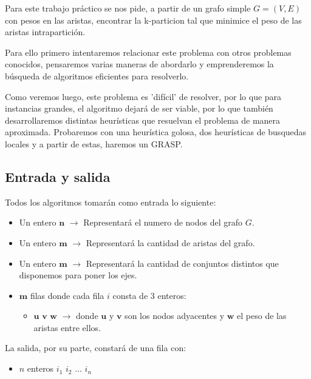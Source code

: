 Para este trabajo práctico se nos pide, a partir de un grafo simple $G=(V,E)$ con pesos en las aristas, encontrar la k-particion tal que minimice el peso de las aristas intrapartición.

Para ello primero intentaremos relacionar este problema con otros problemas conocidos, pensaremos varias maneras de abordarlo y emprenderemos la búsqueda de algoritmos eficientes para resolverlo.

Como veremos luego, este problema es 'difícil' de resolver, por lo que para instancias grandes, el algoritmo dejará de ser viable, por lo que también desarrollaremos distintas heurísticas que resuelvan el problema de manera aproximada. Probaremos con una heurística golosa, dos heurísticas de busquedas locales y a partir de estas, haremos un GRASP.

\subsection{Entrada y salida}

Todos los algoritmos tomarán como entrada lo siguiente:

\begin{itemize}
	\item Un entero $\textbf{n}$ $\rightarrow$ Representará el numero de nodos del grafo $G$.

	\item Un entero $\textbf{m}$ $\rightarrow$ Representará la cantidad de aristas del grafo.

	\item Un entero $\textbf{m}$ $\rightarrow$ Representará la cantidad de conjuntos distintos que disponemos para poner los ejes.

	\item $\textbf{m}$ filas donde cada fila $i$ consta de $3$ enteros:
	\begin{itemize}
		\item $\textbf{u v w}$ $ \rightarrow $ donde $\textbf{u}$ y $\textbf{v}$ son los nodos adyacentes y $\textbf{w}$ el peso de las aristas entre ellos.
	\end{itemize}
\end{itemize}

La salida, por su parte, constar\'a de una fila con:

\begin{itemize}

	\item $n$ enteros $i_1$ $i_2$ $...$ $i_n$

\end{itemize}

